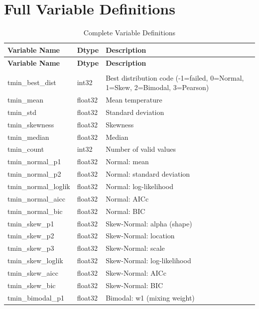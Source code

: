 ﻿\documentclass[12pt,a4paper]{report}
\begin{document}
\chapter{Full Variable Definitions}
\begin{longtable}{p{4cm} p{2cm} p{8cm}}
    \caption{Complete Variable Definitions}
    \label{tab:full_vars} \\
    \toprule
    \textbf{Variable Name} & \textbf{Dtype} & \textbf{Description} \\
    \midrule
    \endfirsthead
    \toprule
    \textbf{Variable Name} & \textbf{Dtype} & \textbf{Description} \\
    \midrule
    \endhead
    \bottomrule
    \endfoot
    
    \multicolumn{3}{c}{\textbf{tmin Variables}} \\
    \midrule
    tmin\_best\_dist & int32 & Best distribution code (-1=failed, 0=Normal, 1=Skew, 2=Bimodal, 3=Pearson) \\
    tmin\_mean & float32 & Mean temperature \\
    tmin\_std & float32 & Standard deviation \\
    tmin\_skewness & float32 & Skewness \\
    tmin\_median & float32 & Median \\
    tmin\_count & int32 & Number of valid values \\
    tmin\_normal\_p1 & float32 & Normal: mean \\
    tmin\_normal\_p2 & float32 & Normal: standard deviation \\
    tmin\_normal\_loglik & float32 & Normal: log-likelihood \\
    tmin\_normal\_aicc & float32 & Normal: AICc \\
    tmin\_normal\_bic & float32 & Normal: BIC \\
    tmin\_skew\_p1 & float32 & Skew-Normal: alpha (shape) \\
    tmin\_skew\_p2 & float32 & Skew-Normal: location \\
    tmin\_skew\_p3 & float32 & Skew-Normal: scale \\
    tmin\_skew\_loglik & float32 & Skew-Normal: log-likelihood \\
    tmin\_skew\_aicc & float32 & Skew-Normal: AICc \\
    tmin\_skew\_bic & float32 & Skew-Normal: BIC \\
    tmin\_bimodal\_p1 & float32 & Bimodal: w1 (mixing weight) \\

\end{longtable}
\end{document}
